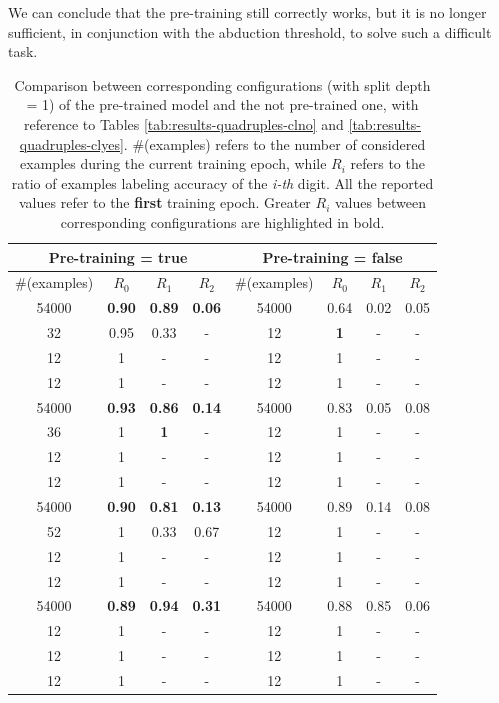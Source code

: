 We can conclude that the pre-training still correctly works, but it is no longer sufficient, in conjunction with the abduction threshold, to solve such a difficult task. 

\begin{table}[H]
  \centering
  \caption{Comparison between corresponding configurations (with split depth = 1) of the pre-trained model and the not pre-trained one, with reference to Tables \ref{tab:results-quadruples-clno} and \ref{tab:results-quadruples-clyes}. \#(examples) refers to the number of considered examples during the current training epoch, while $R_i$ refers to the ratio of examples labeling accuracy of the \textit{i-th} digit. All the reported values refer to the \textbf{first} training epoch. Greater $R_i$ values between corresponding configurations are highlighted in bold.}
  \label{tab:comparison-pre-training}
  \small
  \begin{tabular}{cccc|cccc}
	\multicolumn{4}{c|}{\textbf{Pre-training = true}} & \multicolumn{4}{c}{\textbf{Pre-training = false}}\\
	\hline
	\multicolumn{1}{c}{\#(examples)} & $R_0$ & $R_1$ & $R_2$ & 
	\multicolumn{1}{c}{\#(examples)} & $R_0$ & $R_1$ & \multicolumn{1}{c}{$R_2$} \\
	\hline
	54000	& \textbf{0.90}	& \textbf{0.89}	& \textbf{0.06}	& 54000	& 0.64	& 0.02	& 0.05 \\
	32		& 0.95	& 0.33	& -		& 12	& \textbf{1}	& -		& - \\
	12		& 1		& -		& -		& 12	& 1		& -		& - \\
	12		& 1		& -		& -		& 12	& 1		& -		& - \\
	54000	& \textbf{0.93}	& \textbf{0.86}	& \textbf{0.14}	& 54000	& 0.83	& 0.05	& 0.08 \\
	36		& 1		& \textbf{1}		& -	& 12	& 1		& -		& - \\
	12		& 1		& -		& -		& 12	& 1		& -		& - \\
	12		& 1		& -		& -		& 12	& 1		& -		& - \\
	
	54000	& \textbf{0.90}	& \textbf{0.81}	& \textbf{0.13}	& 54000 & 0.89	& 0.14	& 0.08 \\
	52		& 1		& 0.33	& 0.67	& 12	& 1		& -		& - \\
	12		& 1		& -		& -		& 12	& 1		& -		& - \\
	12		& 1		& -		& -		& 12	& 1		& -		& - \\
	54000	& \textbf{0.89}	& \textbf{0.94}	& \textbf{0.31}	& 54000 & 0.88	& 0.85	& 0.06 \\
	12		& 1		& -		& -		& 12	& 1		& -		& - \\
	12		& 1		& -		& -		& 12	& 1		& -		& - \\
	12		& 1		& -		& -		& 12	& 1		& -		& - \\
	

\end{tabular}
\end{table}
